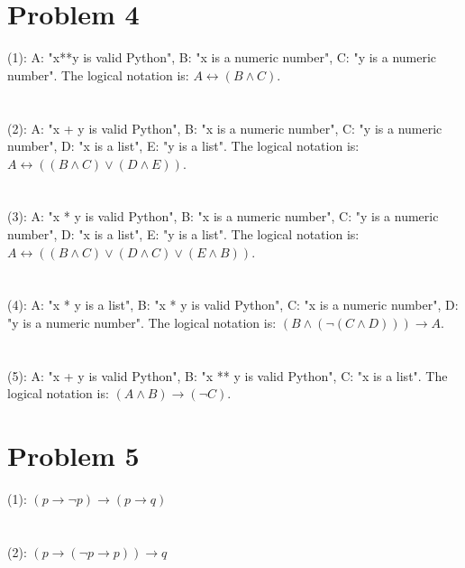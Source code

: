 \documentclass{article}
\begin{document}
\section{Problem 4}
(1): A: "x**y is valid Python", B: "x is a numeric number", C: "y is a numeric number". The logical notation is: $A \leftrightarrow (B \wedge C)$.\\
\\ \hspace*{\fill} \\
(2): A: "x + y is valid Python", B: "x is a numeric number", C: "y is a numeric number", D: "x is a list", E: "y is a list". The logical notation is: $A \leftrightarrow ((B \wedge C) \vee (D \wedge E))$.\\
\\ \hspace*{\fill} \\
(3): A: "x * y is valid Python", B: "x is a numeric number", C: "y is a numeric number", D: "x is a list", E: "y is a list". The logical notation is: $A \leftrightarrow ((B \wedge C) \vee (D \wedge C) \vee (E \wedge B))$.\\
\\ \hspace*{\fill} \\
(4): A: "x * y is a list", B: "x * y is valid Python", C: "x is a numeric number", D: "y is a numeric number". The logical notation is: $(B \wedge (\neg (C \wedge D))) \rightarrow A$.\\
\\ \hspace*{\fill} \\
(5): A: "x + y is valid Python", B: "x ** y is valid Python", C: "x is a list". The logical notation is: $(A \wedge B) \rightarrow (\neg C)$.\\
\section{Problem 5}
(1): $(p \rightarrow \neg p) \rightarrow (p \rightarrow q)$\\
\\ \hspace*{\fill} \\
(2): $(p \rightarrow (\neg p \rightarrow p)) \rightarrow q$\\
\end{document}

